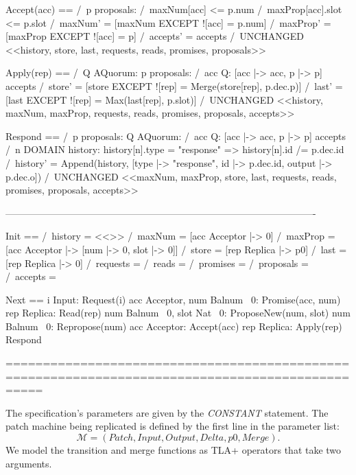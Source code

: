\documentclass[12pt,a4paper,en]{pracamgr}
\newcommand{\ti}[1]{\textit{#1}}
\newcommand{\mc}[1]{\mathcal{#1}}
\begin{document}
\begin{tla}
Accept(acc) ==
    /\ \E p \in proposals:
        /\ maxNum[acc] <= p.num
        /\ maxProp[acc].slot <= p.slot
        /\ maxNum' = [maxNum EXCEPT ![acc] = p.num]
        /\ maxProp' = [maxProp EXCEPT ![acc] = p]
        /\ accepts' = accepts 
    /\ UNCHANGED <<history, store, last,
                   requests, reads, promises, proposals>>

Apply(rep) ==
    /\ \E Q \in AQuorum: \E p \in proposals:
         /\ \A acc \in Q: [acc |-> acc, p |-> p] \in accepts
         /\ store' = [store EXCEPT ![rep] = Merge(store[rep], p.dec.p)]
         /\ last' = [last EXCEPT ![rep] = Max(last[rep], p.slot)]
    /\ UNCHANGED <<history, maxNum, maxProp,
                   requests, reads, promises, proposals, accepts>>

Respond ==
    /\ \E p \in proposals: \E Q \in AQuorum:
         /\ \A acc \in Q: [acc |-> acc, p |-> p] \in accepts
         /\ \A n \in DOMAIN history:
             history[n].type = "response" => history[n].id /= p.dec.id
         /\ history' = Append(history,
                              [type |-> "response", id |-> p.dec.id, output |-> p.dec.o])
    /\ UNCHANGED <<maxNum, maxProp, store, last,
                   requests, reads, promises, proposals, accepts>>

-------------------------------------------------------------------------------------------------

Init ==
    /\ history = <<>>
    /\ maxNum = [acc \in Acceptor |-> 0]
    /\ maxProp = [acc \in Acceptor |-> [num |-> 0, slot |-> 0]]
    /\ store = [rep \in Replica |-> p0]
    /\ last = [rep \in Replica |-> 0]
    /\ requests = {}
    /\ reads = {}
    /\ promises = {}
    /\ proposals = {}
    /\ accepts = {}

Next ==
    \/ \E i \in Input: Request(i)
    \/ \E acc \in Acceptor, num \in Balnum \ {0}: Promise(acc, num)
    \/ \E rep \in Replica: Read(rep)
    \/ \E num \in Balnum \ {0}, slot \in Nat \ {0}: ProposeNew(num, slot)
    \/ \E num \in Balnum \ {0}: Repropose(num)
    \/ \E acc \in Acceptor: Accept(acc)
    \/ \E rep \in Replica: Apply(rep)
    \/ Respond

=================================================================================================
\end{tla}

The specification's parameters are given by the \ti{CONSTANT} statement. The patch machine being replicated is defined by the first line in the parameter list:
$$ \mc M = (Patch, Input, Output, Delta, p0, Merge). $$
We model the transition and merge functions as TLA+ operators that take two arguments.
\end{document}
